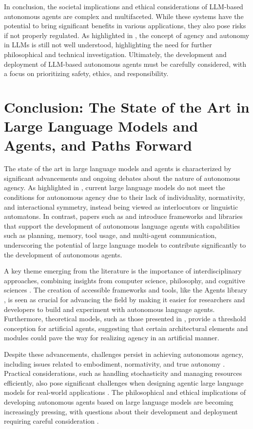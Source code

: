 \documentclass[conference]{IEEEtran}
\begin{document}
In conclusion, the societal implications and ethical considerations of LLM-based autonomous agents are complex and multifaceted. While these systems have the potential to bring significant benefits in various applications, they also pose risks if not properly regulated. As highlighted in \cite{2407.10735}, the concept of agency and autonomy in LLMs is still not well understood, highlighting the need for further philosophical and technical investigation. Ultimately, the development and deployment of LLM-based autonomous agents must be carefully considered, with a focus on prioritizing safety, ethics, and responsibility.

\section{Conclusion: The State of the Art in Large Language Models and Agents, and Paths Forward}
The state of the art in large language models and agents is characterized by significant advancements and ongoing debates about the nature of autonomous agency. As highlighted in \cite{2407.10735}, current large language models do not meet the conditions for autonomous agency due to their lack of individuality, normativity, and interactional symmetry, instead being viewed as interlocutors or linguistic automatons. In contrast, papers such as \cite{2308.11432} and \cite{2309.07870} introduce frameworks and libraries that support the development of autonomous language agents with capabilities such as planning, memory, tool usage, and multi-agent communication, underscoring the potential of large language models to contribute significantly to the development of autonomous agents.

A key theme emerging from the literature is the importance of interdisciplinary approaches, combining insights from computer science, philosophy, and cognitive sciences \cite{2407.16190}. The creation of accessible frameworks and tools, like the Agents library \cite{2309.07870}, is seen as crucial for advancing the field by making it easier for researchers and developers to build and experiment with autonomous language agents. Furthermore, theoretical models, such as those presented in \cite{2407.16190}, provide a threshold conception for artificial agents, suggesting that certain architectural elements and modules could pave the way for realizing agency in an artificial manner.

Despite these advancements, challenges persist in achieving autonomous agency, including issues related to embodiment, normativity, and true autonomy \cite{2308.11432}. Practical considerations, such as handling stochasticity and managing resources efficiently, also pose significant challenges when designing agentic large language models for real-world applications \cite{2412.04093}. The philosophical and ethical implications of developing autonomous agents based on large language models are becoming increasingly pressing, with questions about their development and deployment requiring careful consideration \cite{2407.16190}.
\end{document}
